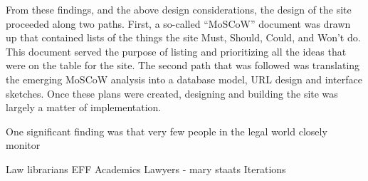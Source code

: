 From these findings, and the above design considerations, the design of the site proceeded along two paths. First, a so-called ``MoSCoW'' document was drawn up that contained lists of the things the site Must, Should, Could, and Won't do. This document served the purpose of listing and prioritizing all the ideas that were on the table for the site. The second path that was followed was translating the emerging MoSCoW analysis into a database model, URL design and interface sketches. Once these plans were created, designing and building the site was largely a matter of implementation. 




One significant finding was that very few people in the legal world closely monitor 


Law librarians
EFF
Academics
Lawyers
 - mary staats
Iterations




